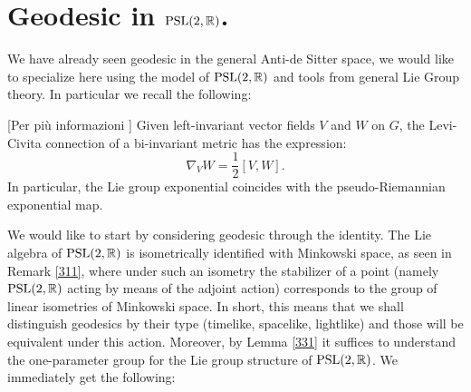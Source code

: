 \section{Geodesic in $\text{PSL}(2,\mathbb{R})$.} We have already seen geodesic in the general Anti-de Sitter space, we would like to specialize here using the model of $\text{PSL}(2,\mathbb{R})$ and tools from general Lie Group theory. In particular we recall the following: 
\begin{lemma}\label{331}[Per più informazioni \cite{bonsanteseppi}]
    Given left-invariant vector fields $V$ and $W$ on $G$, the Levi-Civita connection of a bi-invariant metric has the expression: 
    \[
        \nabla_VW=\frac{1}{2}[V,W].
    \]
    In particular, the Lie group exponential coincides with the pseudo-Riemannian exponential map.
\end{lemma}




We would like to start by considering geodesic through the identity. The Lie algebra of $\text{PSL}(2,\mathbb{R})$ is isometrically identified with Minkowski space, as seen in Remark \ref{311}, where under such an isometry the stabilizer of a point (namely $\text{PSL}(2,\mathbb{R})$ acting by means of the adjoint action) corresponds to the group of linear isometries of Minkowski space. In short, this means that we shall distinguish geodesics by their type (timelike, spacelike, lightlike) and those will be equivalent under this action. Moreover, by Lemma \ref{331} it suffices to understand the one-parameter group for the Lie group structure of $\text{PSL}(2,\mathbb{R})$. We immediately get the following:

